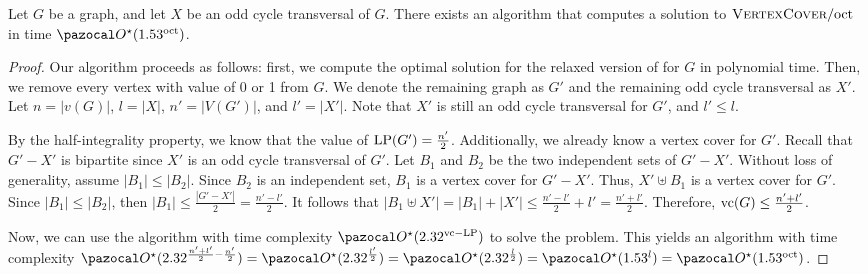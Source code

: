 \begin{theorem}
    \label{theorem:indeset-oct}
    Let $G$ be a graph, and let $X$ be an odd cycle transversal of $G$. There exists an algorithm that computes a solution to $\textsc{VertexCover}/\text{oct}$ in time $\O^\star(1.53^\oct)$.
\end{theorem}

\begin{proof}
    Our algorithm proceeds as follows: first, we compute the optimal solution for the relaxed version of  for $G$ in polynomial time. Then, we remove every vertex with value of 0 or 1 from $G$. We denote the remaining graph as $G'$ and the remaining odd cycle transversal as $X'$. Let $n = |v(G)|$, $l = |X|$, $n' = |V(G')|$, and $l' = |X'|$. Note that $X'$ is still an odd cycle transversal for $G'$, and $l' \leq l$.

    By the half-integrality property, we know that the value of $\text{LP}(G') = \frac{n'}{2}$. Additionally, we already know a vertex cover for $G'$. Recall that $G' - X'$ is bipartite since $X'$ is an odd cycle transversal of $G'$. Let $B_1$ and $B_2$ be the two independent sets of $G' - X'$. Without loss of generality, assume $|B_1| \leq |B_2|$. Since $B_2$ is an independent set, $B_1$ is a vertex cover for $G' - X'$. Thus, $X' \uplus B_1$ is a vertex cover for $G'$. Since $|B_1| \leq |B_2|$, then $|B_1| \leq \frac{|G' - X'|}{2} = \frac{n' - l'}{2}$. It follows that $|B_1 \uplus X'| = |B_1| + |X'| \leq \frac{n' - l'}{2} + l' = \frac{n' + l'}{2}$. Therefore, $\text{vc}(G) \leq \frac{n' + l'}{2}$.

    Now, we can use the algorithm with time complexity $\O^\star(2.32^{\vc - \LP})$ to solve the problem. This yields an algorithm with time complexity $\O^\star(2.32^{\frac{n' + l'}{2} - \frac{n'}{2}}) = \O^\star(2.32^{\frac{l'}{2}}) = \O^\star(2.32^{\frac{l}{2}}) = \O^\star(1.53^l) = \O^\star(1.53^\oct)$.
\end{proof}